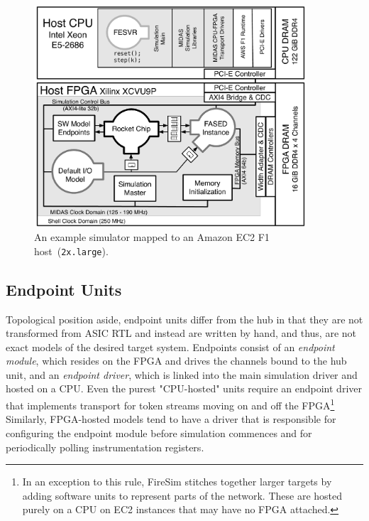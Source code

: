 \begin{figure}
    \centering
    \includegraphics[width=0.9\textwidth]{figures/mapped-simulator-f1.pdf}
    \caption{An example simulator mapped to an Amazon EC2 F1 host~(\texttt{2x.large}).}
    \label{fig:mapped-simulator-f1}
\end{figure}


\subsection{Endpoint Units}\label{sec:midas-endpoints}

Topological position aside, endpoint units differ from the hub in that they are not transformed from ASIC
RTL and instead are written by hand, and thus, are not exact models of the desired target system.
Endpoints consist of an \emph{endpoint module}, which resides on the FPGA and drives the channels bound to the hub unit, and an
\emph{endpoint driver}, which is linked into the main simulation driver and hosted on a CPU.
Even the purest "CPU-hosted" units require an endpoint driver that
implements transport for token streams moving on and off the
FPGA\footnote{In an exception to this rule, FireSim stitches together larger targets by adding software units
to represent parts of the network. These are hosted purely on a CPU on EC2 instances that may have no FPGA attached.}
Similarly, FPGA-hosted models tend to have a driver
that is responsible for configuring the endpoint module before simulation commences and for periodically polling
instrumentation registers.

